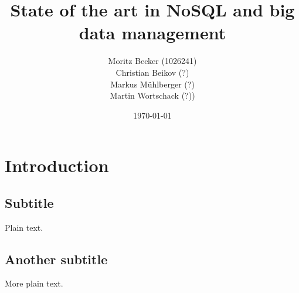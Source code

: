 \documentclass[twocolumn,a4paper]{sig-alternate}
\title{State of the art in NoSQL and big data management}
\author{Moritz Becker (1026241) \\ Christian Beikov (?) \\ Markus Mühlberger
(?) \\ Martin Wortschack (?))}
\date{\today}
\begin{document}
\maketitle



\section{Introduction}

\subsection{Subtitle}

Plain text.

\subsection{Another subtitle}

More plain text.
\end{document}
